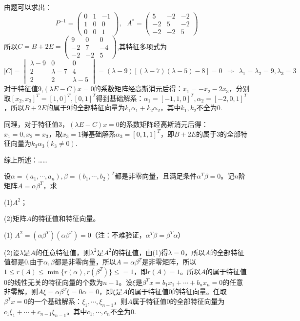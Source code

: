 \documentclass[a4paper]{report}
\begin{document}
\begin{jie}
由题可以求出：
\begin{equation*}
P^{-1}=
\begin{pmatrix}
0&1&-1\\
1&0&0\\
0&0&1
\end{pmatrix},~~~A^*=
\begin{pmatrix}
5&-2&-2\\
-2&5&-2\\
-2&-2&5
\end{pmatrix}
\end{equation*}
所以$C=B+2E=
\begin{pmatrix}
9&0&0\\
-2&7&-4\\
-2&-2&5
\end{pmatrix}
$,其特征多项式为
\begin{equation*}
|C|=
\begin{vmatrix}
 \lambda-9&0&0\\
2& \lambda-7&4\\
2&2& \lambda-5
\end{vmatrix}=(\lambda-9)[(\lambda-7)(\lambda-5)-8]=0~~\Rightarrow~~\lambda_1=\lambda_2=9,\lambda_3=3
\end{equation*}
对于特征值$9$,$(\lambda E-C)x=0$的系数矩阵经高斯消元后得：$x_1=-x_2-2x_3$，分别取$[x_2,x_3]^T=[1,0]^T,[0,1]^T$得到基础解系：$\alpha_1=[-1,1,0]^T,\alpha_2=[-2,0,1]^T$，所以$B+2E$的属于$9$的全部特征向量为$k_1\alpha_1+k_2\alpha_2$，其中$k_1,k_2$不全为0.

同理，对于特征值3，$(\lambda E-C)x=0$的系数矩阵经高斯消元后得：$x_1=0,x_2=x_3$，取$x_3=1$得基础解系$\alpha_3=[0,1,1]^T$，即$B+2E$的属于$3$的全部特征向量为$k_3\alpha_3(k_3\neq 0)$.

综上所述：……
\end{jie}

\EX 设$\alpha=(a_1,\cdots,a_n),\beta=(b_1,\cdots,b_2)^T$都是非零向量，且满足条件$\alpha^T\beta=0$。记$n$阶矩阵$A=\alpha\beta^T$，求

(1)$A^2$；

(2)矩阵$A$的特征值和特征向量。

\begin{jie}
(1) $A^2=(\alpha\beta^T)(\alpha\beta^T)=0$（注：不难验证，$\alpha^T\beta=\beta^T\alpha$）

(2)设$\lambda$是$A$的任意特征值，则$\lambda^2$是$A^2$的特征值，由(1)得$\lambda=0$，所以$A$的全部特征值都是0.由于$\alpha,\beta$都是非零向量，所以$A=\alpha\beta^T$是非零矩阵，所以$1\leq r(A)\leq \min\{r(\alpha),r(\beta^T)\}\leq=1$，即$r(A)=1$。所以$A$的属于特征值0的线性无关的特征向量的个数为$n-1$。设$\xi$是$\beta^Tx=b_1x_1+\cdots+b_nx_n=0$的任意非零解，则$A\xi=\alpha\beta^T\xi=0\alpha=0$，即$\xi$是$A$的属于特征值$0$的特征向量。任取$\beta^Tx=0$的一个基础解系：$\xi_1,\cdots,\xi_{n-1}$，则$A$属于特征值0的全部特征向量为$c_1\xi_1+\cdots+c_{n-1}\xi_{n-1}$。其中$c_1,\cdots,c_n$不全为0.
\end{jie}
\end{document}
